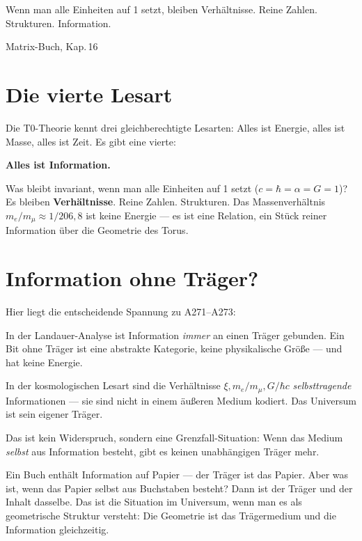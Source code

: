 
\epigraph{Wenn man alle Einheiten auf 1 setzt, bleiben Verhältnisse.
Reine Zahlen. Strukturen. Information.}{Matrix-Buch, Kap.\,16}

\section{Die vierte Lesart}

Die T0-Theorie kennt drei gleichberechtigte Lesarten: Alles ist Energie,
alles ist Masse, alles ist Zeit. Es gibt eine vierte:

\textbf{Alles ist Information.}

Was bleibt invariant, wenn man alle Einheiten auf 1 setzt
($c = \hbar = \alpha = G = 1$)? Es bleiben \textbf{Verhältnisse}.
Reine Zahlen. Strukturen. Das Massenverhältnis $m_e/m_\mu \approx 1/206{,}8$
ist keine Energie --- es ist eine Relation, ein Stück reiner Information
über die Geometrie des Torus. 

\section{Information ohne Träger?}

Hier liegt die entscheidende Spannung zu A271--A273:

In der Landauer-Analyse ist Information \emph{immer} an einen Träger
gebunden. Ein Bit ohne Träger ist eine abstrakte Kategorie, keine
physikalische Größe --- und hat keine Energie. 

In der kosmologischen Lesart sind die Verhältnisse $\xi, m_e/m_\mu, G/\hbar c$
\emph{selbsttragende} Informationen --- sie sind nicht in einem äußeren
Medium kodiert. Das Universum ist sein eigener Träger.

Das ist kein Widerspruch, sondern eine Grenzfall-Situation: Wenn das Medium
\emph{selbst} aus Information besteht, gibt es keinen unabhängigen Träger
mehr.

\begin{laierspur}
Ein Buch enthält Information auf Papier --- der Träger ist das Papier.
Aber was ist, wenn das Papier selbst aus Buchstaben besteht?
Dann ist der Träger und der Inhalt dasselbe. Das ist die Situation im
Universum, wenn man es als geometrische Struktur versteht: Die Geometrie
ist das Trägermedium und die Information gleichzeitig.
\end{laierspur}

